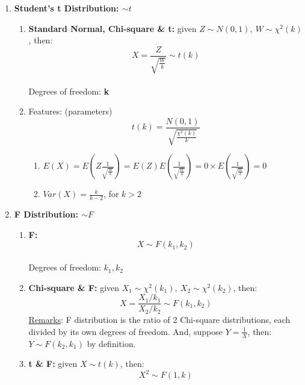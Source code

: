 \documentclass[a4paper,12pt]{article} %
\begin{document}
\begin{enumerate}
\item {{\bf Student's t Distribution: $\sim t$}
\begin{enumerate}
    \item {{\bf Standard Normal, Chi-square \& t:} given $Z \sim N(0,1),\ W \sim \chi^2(k)$, then: $$ X=\frac{Z}{\sqrt{\frac{W}{k}}} \sim t(k) $$ \\Degrees of freedom: {\bf k}
    }
    \item {Features: (parameters)$$ t(k)=\frac{N(0,1)}{\sqrt{\frac{\chi^2(k)}{k}}} $$ 
    \begin{enumerate}
        \item $E(X)=E(Z\frac{1}{\sqrt{\frac{W}{k}}})=E(Z)E(\frac{1}{\sqrt{\frac{W}{k}}})=0 \times E(\frac{1}{\sqrt{\frac{W}{k}}})=0$
        \item $Var(X)=\frac{k}{k-2}$, for $k>2$\\
    \end{enumerate}
    }
\end{enumerate}
}

\item {{\bf F Distribution: $\sim F$}
\begin{enumerate}
    \item {{\bf F:} $$ X \sim F(k_1,k_2) $$\\Degrees of freedom: {\bf $k_1, k_2$}
    }
    \item {{\bf Chi-square \& F:} given $X_1 \sim \chi^2(k_1),\ X_2 \sim \chi^2(k_2)$, then: $$ X=\frac{X_1/k_1}{X_2/k_2} \sim F(k_1,k_2) $$ 
    \underline{Remarks}: F distribution is the ratio of 2 Chi-square distributions, each divided by its own degrees of freedom. And, suppose $Y=\frac{1}{X}$, then: $Y \sim F(k_2,k_1)$ by definition.
    }
    \item {{\bf t \& F:} given $X \sim t(k)$, then: $$ X^2 \sim F(1,k) $$ \\
    }
\end{enumerate}
}


\end{enumerate}
\end{document}
